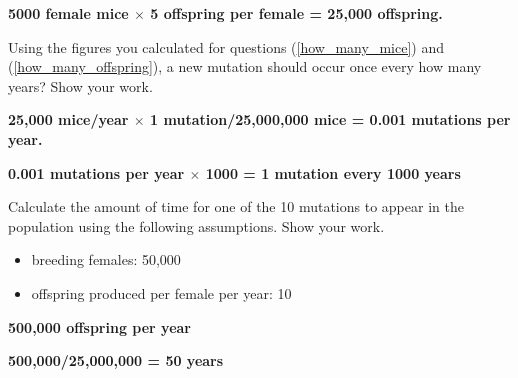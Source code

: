 \documentclass[11pt, addpoints]{exam}
\begin{document}
\begin{questions}
\ifprintanswers\vspace{\baselineskip}
	\textbf{5000 female mice $\times$ 5 offspring per female = 25,000 offspring.}
\else
\fi

\question[1]
\label{mutes_per_year}Using the figures you calculated for questions (\ref{how_many_mice}) and (\ref{how_many_offspring}),
a new mutation should occur once every how many years? Show your work.

\ifprintanswers\vspace{\baselineskip}
	\textbf{25,000 mice/year $\times$ 1 mutation/25,000,000 mice = 0.001 mutations per year.}
	
	\textbf{0.001 mutations per year $\times$ 1000 = 1 mutation every 1000 years}
\else
\fi


\question[1]
\label{ten_mutations}Calculate the amount of time for one of the 10 mutations to
appear in the population using the following assumptions. Show your work.

\begin{itemize}
\item
  breeding females: 50,000
\item
  offspring produced per female per year: 10
\end{itemize}

\ifprintanswers\vspace{\baselineskip}
	\textbf{500,000 offspring per year} 
	
	\textbf{500,000/25,000,000 = 50 years}
\else
\fi

\newpage


\end{questions}
\end{document}
